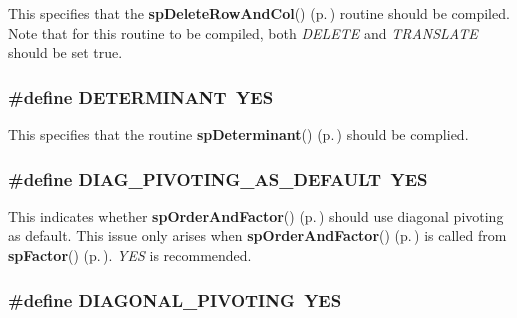 This specifies that the {\bf sp\-Delete\-Row\-And\-Col}() {\rm (p.\,\pageref{spUtils_8c_a18})} routine should be compiled. Note that for this routine to be compiled, both {\em DELETE} and {\em TRANSLATE} should be set true. 
\subsubsection{\setlength{\rightskip}{0pt plus 5cm}\#define DETERMINANT\ YES}\label{spConfig_8h_a15}


This specifies that the routine {\bf sp\-Determinant}() {\rm (p.\,\pageref{spUtils_8c_a16})} should be complied. 
\subsubsection{\setlength{\rightskip}{0pt plus 5cm}\#define DIAG\_\-PIVOTING\_\-AS\_\-DEFAULT\ YES}\label{spConfig_8h_a24}


This indicates whether {\bf sp\-Order\-And\-Factor}() {\rm (p.\,\pageref{spFactor_8c_a24})} should use diagonal pivoting as default. This issue only arises when {\bf sp\-Order\-And\-Factor}() {\rm (p.\,\pageref{spFactor_8c_a24})} is called from {\bf sp\-Factor}() {\rm (p.\,\pageref{spFactor_8c_a25})}. {\em YES} is recommended. 
\subsubsection{\setlength{\rightskip}{0pt plus 5cm}\#define DIAGONAL\_\-PIVOTING\ YES}\label{spConfig_8h_a4}


